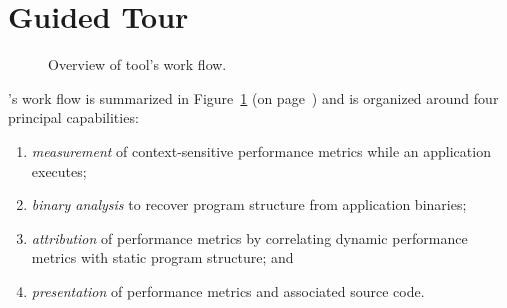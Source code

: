 \documentclass[11pt,letterpaper]{report}
\begin{document}

\section{Guided Tour}
\label{chpt:quickstart:tour}

\begin{figure}[t]
\caption{Overview of \HPCToolkit{} tool's work flow.}
\label{fig:hpctoolkit-overview:b}
\end{figure}

\HPCToolkit{}'s work flow is summarized in Figure~\ref{fig:hpctoolkit-overview:b} (on page~\pageref{fig:hpctoolkit-overview:b}) and is organized around four principal capabilities:
\begin{enumerate}
  \item \emph{measurement} of context-sensitive performance metrics while an application executes;
  \item \emph{binary analysis} to recover program structure from application binaries;
  \item \emph{attribution} of performance metrics by correlating dynamic performance metrics with static program structure; and
  \item \emph{presentation} of performance metrics and associated source code.
\end{enumerate}
\end{document}
